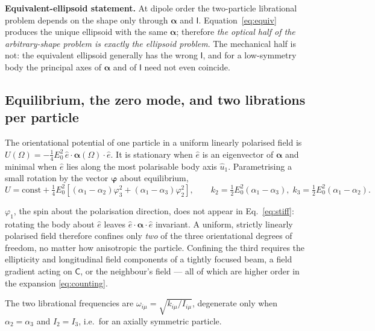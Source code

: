 \documentclass[11pt,a4paper]{article}
\newcommand{\bal}{\boldsymbol{\alpha}}
\newcommand{\bphi}{\boldsymbol{\varphi}}
\begin{document}
\begin{tcolorbox}[colback=blue!4,colframe=blue!45!black]
\textbf{Equivalent-ellipsoid statement.}  At dipole order the two-particle
librational problem depends on the shape only through $\bal$ and $\mathsf I$.
Equation~\eqref{eq:equiv} produces the unique ellipsoid with the same $\bal$;
therefore \emph{the optical half of the arbitrary-shape problem is exactly the
ellipsoid problem}.  The mechanical half is not: the equivalent ellipsoid
generally has the wrong $\mathsf I$, and for a low-symmetry body the principal
axes of $\bal$ and of $\mathsf I$ need not even coincide.
\end{tcolorbox}

\subsection{Equilibrium, the zero mode, and two librations per particle}

The orientational potential of one particle in a uniform linearly polarised
field is $U(\Omega)=-\tfrac14E_0^{2}\,\hat e\cdot\bal(\Omega)\cdot\hat e$.  It is
stationary when $\hat e$ is an eigenvector of $\bal$ and minimal when $\hat e$
lies along the most polarisable body axis $\hat u_1$.  Parametrising a small
rotation by the vector $\bphi$ about equilibrium,
\begin{equation}
  U=\mathrm{const}+\tfrac14E_0^{2}
  \left[(\alpha_1-\alpha_2)\varphi_3^{2}+(\alpha_1-\alpha_3)\varphi_2^{2}\right],
  \qquad
  k_2=\tfrac12E_0^{2}(\alpha_1-\alpha_3),\;
  k_3=\tfrac12E_0^{2}(\alpha_1-\alpha_2).
  \label{eq:stiff}
\end{equation}

\begin{tcolorbox}[colback=orange!6,colframe=orange!55!black,
  title=Exact zero mode --- true for \emph{any} shape]
$\varphi_1$, the spin about the polarisation direction, does not appear in
Eq.~\eqref{eq:stiff}: rotating the body about $\hat e$ leaves
$\hat e\cdot\bal\cdot\hat e$ invariant.  A uniform, strictly linearly polarised
field therefore confines only \emph{two} of the three orientational degrees of
freedom, no matter how anisotropic the particle.  Confining the third requires
the ellipticity and longitudinal field components of a tightly focused beam, a
field gradient acting on $\mathsf C$, or the neighbour's field --- all of which
are higher order in the expansion \eqref{eq:counting}.
\end{tcolorbox}

\noindent
The two librational frequencies are
$\omega_{i\mu}=\sqrt{k_{i\mu}/I_{i\mu}}$, degenerate only when
$\alpha_2=\alpha_3$ and $I_2=I_3$, i.e.\ for an axially symmetric particle.
\end{document}
